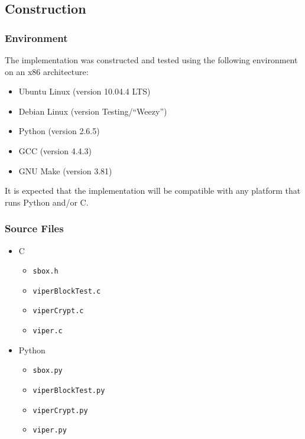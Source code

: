 \subsection{Construction}

\subsubsection{Environment}


The implementation was constructed and tested using the following environment on an x86 architecture:
\begin{itemize}
\item Ubuntu Linux (version 10.04.4 LTS)
\item Debian Linux (version Testing/\enquote{Weezy})
\item Python (version 2.6.5)
\item GCC (version 4.4.3)
\item GNU Make (version 3.81)
\end{itemize}

It is expected that the implementation will be compatible with any platform that runs Python and/or C.

\subsubsection{Source Files}
\begin{itemize}
\item C
	\begin{itemize}
	\item \texttt{sbox.h}
	\item \texttt{viperBlockTest.c}
	\item \texttt{viperCrypt.c}
	\item \texttt{viper.c}
	\end{itemize}
\item Python
	\begin{itemize}
	\item \texttt{sbox.py}
	\item \texttt{viperBlockTest.py}
	\item \texttt{viperCrypt.py}
	\item \texttt{viper.py}
	\end{itemize}
\end{itemize}

